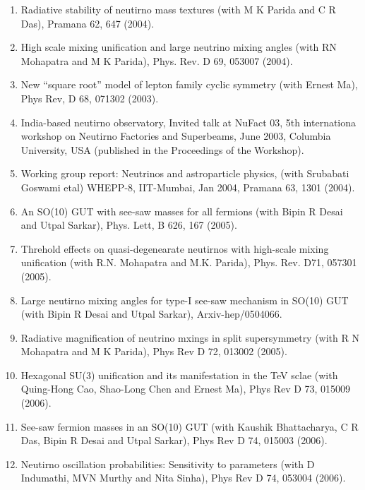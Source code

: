 \begin{enumerate}
\item Radiative stability of neutirno mass textures (with M K Parida and C R Das), Pramana 62, 647 (2004).

\item High scale mixing unification and large neutrino mixing angles (with RN Mohapatra and M K Parida), Phys. Rev. D 69, 053007 (2004).

\item New ``square root'' model of lepton family cyclic symmetry (with Ernest Ma), Phys Rev, D 68, 071302 (2003).

\item India-based neutirno observatory, Invited talk at NuFact 03, 5th internationa workshop on Neutirno Factories and Superbeams, June 2003, Columbia University, USA (published in the Proceedings of the Workshop).

\item Working group report: Neutrinos and astroparticle physics, (with Srubabati Goswami etal) WHEPP-8, IIT-Mumbai, Jan 2004, Pramana 63, 1301 (2004).

\item An SO(10) GUT with see-saw masses for all fermions (with Bipin R Desai and Utpal Sarkar), Phys. Lett, B 626, 167 (2005).

\item Threhold effects on quasi-degenearate neutirnos with high-scale mixing unification (with R.N. Mohapatra and M.K. Parida), Phys. Rev. D71, 057301 (2005).

\item Large neutirno mixing angles for type-I see-saw mechanism in SO(10) GUT (with Bipin R Desai and Utpal Sarkar), Arxiv-hep/0504066.

\item Radiative magnification of neutrino mxings in split supersymmetry (with R N Mohapatra and M K Parida), Phys Rev D 72, 013002 (2005).

\item Hexagonal SU(3) unification and its manifestation in the TeV sclae (with Quing-Hong Cao, Shao-Long Chen and Ernest Ma), Phys Rev D 73, 015009 (2006).

\item See-saw fermion masses in an SO(10) GUT (with Kaushik Bhattacharya, C R Das, Bipin R Desai and Utpal Sarkar), Phys Rev D 74, 015003 (2006).

\item Neutirno oscillation probabilities:  Sensitivity to parameters (with D Indumathi, MVN Murthy and Nita Sinha), Phys Rev D 74, 053004 (2006).


\end{enumerate}
